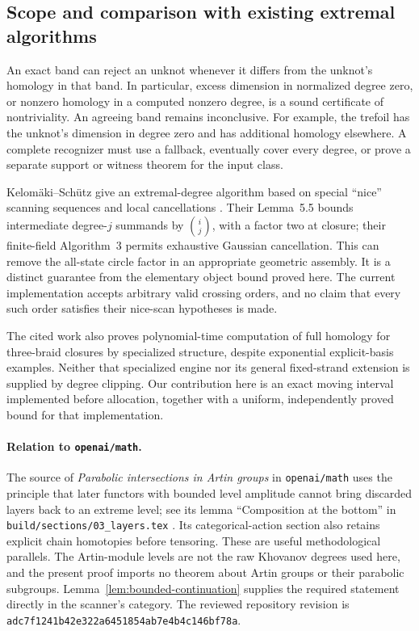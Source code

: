 \subsection{Scope and comparison with existing extremal algorithms}

An exact band can reject an unknot whenever it differs from the unknot's
homology in that band.  In particular, excess dimension in normalized
degree zero, or nonzero homology in a computed nonzero degree, is a sound
certificate of nontriviality.  An agreeing band remains inconclusive.
For example, the trefoil has the unknot's dimension in degree zero and has
additional homology elsewhere.  A complete recognizer must use a fallback,
eventually cover every degree, or prove a separate support or witness
theorem for the input class.

Kelom\"aki--Sch\"utz give an extremal-degree algorithm based on special
``nice'' scanning sequences and local cancellations
\cite{kelomaki}.  Their Lemma~5.5 bounds intermediate degree-$j$ summands by
$\binom{i}{j}$, with a factor two at closure; their finite-field
Algorithm~3 permits exhaustive Gaussian cancellation.  This can remove
the all-state circle factor in an appropriate geometric assembly.  It is
a distinct guarantee from the elementary object bound proved here.  The
current implementation accepts arbitrary valid crossing orders, and no
claim that every such order satisfies their nice-scan hypotheses is made.

The cited work also proves polynomial-time computation of full homology
for three-braid closures by specialized structure, despite exponential
explicit-basis examples.  Neither that specialized engine nor its general
fixed-strand extension is supplied by degree clipping.  Our contribution
here is an exact moving interval implemented before allocation, together
with a uniform, independently proved bound for that implementation.

\paragraph{Relation to \texttt{openai/math}.}
The source of \emph{Parabolic intersections in Artin groups} in
\texttt{openai/math} uses the principle that later functors
with bounded level amplitude cannot bring discarded layers back to an
extreme level; see its lemma ``Composition at the bottom'' in
\texttt{build/sections/03\_layers.tex} \cite{openai_artin}.  Its categorical-action section
also retains explicit chain homotopies before tensoring.  These are useful
methodological parallels.  The Artin-module levels are not the raw
Khovanov degrees used here, and the present proof imports no theorem about
Artin groups or their parabolic subgroups.  Lemma~\ref{lem:bounded-continuation}
supplies the required statement directly in the scanner's category.  The
reviewed repository revision is
\texttt{adc7f1241b42e322a6451854ab7e4b4c146bf78a}.
